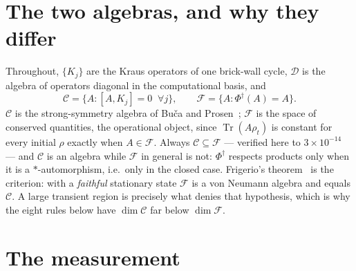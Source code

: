 \documentclass[11pt]{article}
\newcommand{\Tr}{\operatorname{Tr}}
\newcommand{\Phid}{\Phi^{\dagger}}
\newcommand{\C}{\mathcal{C}}
\newcommand{\F}{\mathcal{F}}
\newcommand{\D}{\mathcal{D}}
\theoremstyle{plain}
\theoremstyle{remark}
\begin{document}
\begin{abstract}
statement has a one-line origin, which we prove: $W_{73}$ and $W_{109}$ are the
unitary Floquet-$P^0HP^0$ and Floquet-$P^1HP^1$ rules $W_{201}$ and $W_{108}$
with a \emph{single identity gate replaced by a reset}, and on the constrained
space the reset can never fire, so the dissipative rule acts there exactly as
its unitary parent --- identically, to zero, for $N = 4,\dots,11$. This
generalises: all eight are children of the four single-$V$ rules, every
non-trivial enclosure is exactly a Krylov sector of its parent, and whether the
parent's projector reads a symmetric pattern or a domain wall decides the rest
--- symmetric gives the blockade space and an entangling PXP-type circuit,
asymmetric gives tiling subcubes carrying a bare tensor product of single-site
Hadamards. One slot of the gate word separates an interacting model from a free
one.
\end{abstract}

\tableofcontents

\section{The two algebras, and why they differ}

Throughout, $\{K_j\}$ are the Kraus operators of one brick-wall cycle, $\D$ is
the algebra of operators diagonal in the computational basis, and
\[
  \C = \{A : [A, K_j] = 0 \;\;\forall j\},
  \qquad
  \F = \{A : \Phid(A) = A\}.
\]
$\C$ is the strong-symmetry algebra of Bu\v{c}a and Prosen~\cite{buca2012}; $\F$
is the space of conserved quantities, the operational object, since
$\Tr(A\rho_t)$ is constant for every initial $\rho$ exactly when $A \in \F$.
Always $\C \subseteq \F$ --- verified here to $3\times10^{-14}$ --- and $\C$ is
an algebra while $\F$ in general is not: $\Phid$ respects products only when it
is a $*$-automorphism, i.e.\ only in the closed case. Frigerio's
theorem~\cite{frigerio1978} is the criterion: with a \emph{faithful} stationary
state $\F$ is a von Neumann algebra and equals $\C$. A large transient region is
precisely what denies that hypothesis, which is why the eight rules below have
$\dim\C$ far below $\dim\F$.

\section{The measurement}
\end{document}

